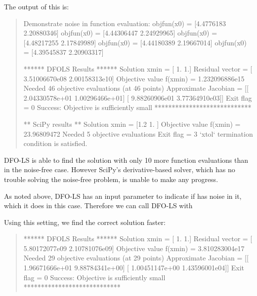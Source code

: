 \documentclass[letterpaper,10pt,english]{sphinxmanual}
\begin{document}
The output of this is:
\begin{quote}

\begin{sphinxVerbatim}[commandchars=\\\{\}]
Demonstrate noise in function evaluation:
objfun(x0) = [\PYGZhy{}4.4776183   2.20880346]
objfun(x0) = [\PYGZhy{}4.44306447  2.24929965]
objfun(x0) = [\PYGZhy{}4.48217255  2.17849989]
objfun(x0) = [\PYGZhy{}4.44180389  2.19667014]
objfun(x0) = [\PYGZhy{}4.39545837  2.20903317]

****** DFO\PYGZhy{}LS Results ******
Solution xmin = [ 1.  1.]
Residual vector = [  3.51006670e\PYGZhy{}08   2.00158313e\PYGZhy{}10]
Objective value f(xmin) = 1.232096886e\PYGZhy{}15
Needed 46 objective evaluations (at 46 points)
Approximate Jacobian = [[ \PYGZhy{}2.04330578e+01   1.00296466e+01]
 [ \PYGZhy{}9.88260906e\PYGZhy{}01  \PYGZhy{}3.77364910e\PYGZhy{}03]]
Exit flag = 0
Success: Objective is sufficiently small
****************************


** SciPy results **
Solution xmin = [\PYGZhy{}1.2  1. ]
Objective value f(xmin) = 23.96809472
Needed 5 objective evaluations
Exit flag = 3
{}`xtol{}` termination condition is satisfied.
\end{sphinxVerbatim}
\end{quote}

DFO-LS is able to find the solution with only 10 more function evaluations than in the noise-free case. However SciPy’s derivative-based solver, which has no trouble solving the noise-free problem, is unable to make any progress.

As noted above, DFO-LS has an input parameter  to indicate if  has noise in it, which it does in this case. Therefore we can call DFO-LS with
\begin{quote}

\begin{sphinxVerbatim}[commandchars=\\\{\}]
    
\end{sphinxVerbatim}
\end{quote}

Using this setting, we find the correct solution faster:
\begin{quote}

\begin{sphinxVerbatim}[commandchars=\\\{\}]
****** DFO\PYGZhy{}LS Results ******
Solution xmin = [ 1.  1.]
Residual vector = [ \PYGZhy{}5.80172077e\PYGZhy{}09   2.10781076e\PYGZhy{}09]
Objective value f(xmin) = 3.810283004e\PYGZhy{}17
Needed 29 objective evaluations (at 29 points)
Approximate Jacobian = [[ \PYGZhy{}1.96671666e+01   9.88784341e+00]
 [ \PYGZhy{}1.00451147e+00   1.43596001e\PYGZhy{}04]]
Exit flag = 0
Success: Objective is sufficiently small
****************************
\end{sphinxVerbatim}
\end{quote}
\end{document}
